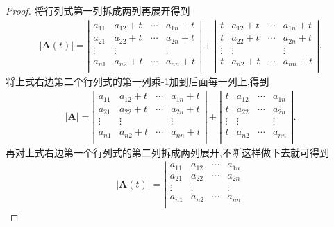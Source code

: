\documentclass[../../main.tex]{subfiles}
\begin{document}
\begin{proof}
将行列式第一列拆成两列再展开得到
\begin{align*}
|\boldsymbol{A}(t)|=\left| \begin{matrix}
a_{11}&		a_{12}+t&		\cdots&		a_{1n}+t\\
a_{21}&		a_{22}+t&		\cdots&		a_{2n}+t\\
\vdots&		\vdots&		&		\vdots\\
a_{n1}&		a_{n2}+t&		\cdots&		a_{nn}+t\\
\end{matrix} \right|+\left| \begin{matrix}
t&		a_{12}+t&		\cdots&		a_{1n}+t\\
t&		a_{22}+t&		\cdots&		a_{2n}+t\\
\vdots&		\vdots&		&		\vdots\\
t&		a_{n2}+t&		\cdots&		a_{nn}+t\\
\end{matrix} \right|.
\nonumber
\end{align*}
将上式右边第二个行列式的第一列乘-1加到后面每一列上,得到
\begin{align*}
\left| \boldsymbol{A} \right|=\left| \begin{matrix}
a_{11}&		a_{12}+t&		\cdots&		a_{1n}+t\\
a_{21}&		a_{22}+t&		\cdots&		a_{2n}+t\\
\vdots&		\vdots&		&		\vdots\\
a_{n1}&		a_{n2}+t&		\cdots&		a_{nn}+t\\
\end{matrix} \right|+\left| \begin{matrix}
t&		a_{12}&		\cdots&		a_{1n}\\
t&		a_{22}&		\cdots&		a_{2n}\\
\vdots&		\vdots&		&		\vdots\\
t&		a_{n2}&		\cdots&		a_{nn}\\
\end{matrix} \right| .
\nonumber
\end{align*}
再对上式右边第一个行列式的第二列拆成两列展开,不断这样做下去就可得到
\begin{gather*}
|\boldsymbol{A}(t)|=\left| \begin{matrix}
a_{11}&		a_{12}&		\cdots&		a_{1n}\\
a_{21}&		a_{22}&		\cdots&		a_{2n}\\
\vdots&		\vdots&		&		\vdots\\
a_{n1}&		a_{n2}&		\cdots&		a_{nn}\\

\end{matrix}
\end{gather*}
\end{proof}
\end{document}
